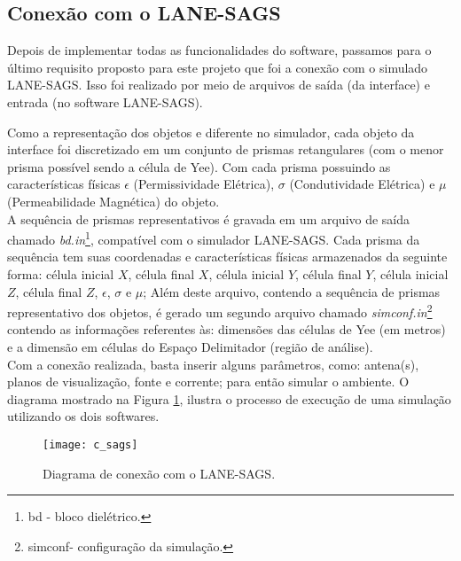 	\subsection{Conexão com o LANE-SAGS}
	Depois de implementar todas as funcionalidades do software, passamos para o último requisito proposto para este projeto que foi a conexão com o simulado LANE-SAGS. Isso foi realizado por meio de arquivos de saída (da interface) e entrada (no software LANE-SAGS).

	Como a representação dos objetos e diferente no simulador, cada objeto da interface foi discretizado em um conjunto de prismas retangulares (com o menor prisma possível sendo a célula de Yee). Com cada prisma possuindo as características físicas $\epsilon$ (Permissividade Elétrica), $\sigma$ (Condutividade Elétrica) e $\mu$ (Permeabilidade Magnética) do objeto.\\

	A sequência de prismas representativos é gravada em um arquivo de saída chamado \textit{bd.in}\footnote{bd - bloco dielétrico.}, compatível com o simulador LANE-SAGS. Cada prisma da sequência tem suas coordenadas e características físicas armazenados da seguinte forma: célula inicial $X$, célula final $X$, célula inicial $Y$, célula final $Y$, célula inicial $Z$, célula final $Z$, $\epsilon$, $\sigma$ e $\mu$; Além deste arquivo, contendo a sequência de prismas representativo dos objetos, é gerado um segundo arquivo chamado \textit{simconf.in}\footnote{simconf- configuração da simulação.} contendo as informações referentes às: dimensões das células de Yee (em metros) e a dimensão em células do Espaço Delimitador (região de análise).\\

	Com a conexão realizada, basta inserir alguns parâmetros, como: antena(s), planos de visualização, fonte e corrente; para então simular o ambiente. O diagrama mostrado na Figura \ref{fg:c_sags}, ilustra o processo de execução de uma simulação utilizando os dois softwares.
\begin{figure}[htp]
	\centering
	\texttt{[image: c\_sags]}
	\caption{Diagrama de conexão com o LANE-SAGS.}
	\label{fg:c_sags}
\end{figure}
